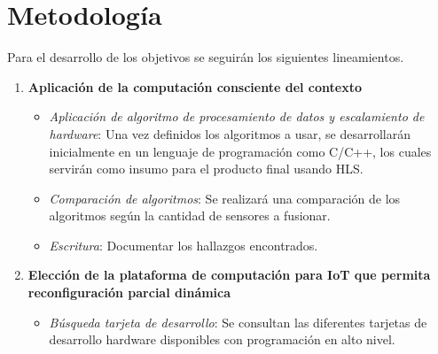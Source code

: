 
\chapter{Metodología} %
\label{Chapter8}

Para el desarrollo de  los objetivos se seguirán los siguientes lineamientos.
\begin{enumerate}
\item \textbf{Aplicación de la computación consciente del contexto}
\begin{itemize}
\item \textit{Aplicación de algoritmo de procesamiento de datos y escalamiento de hardware}: Una vez definidos los algoritmos a usar, se desarrollarán inicialmente en un lenguaje de programación como C/C++, los cuales servirán como insumo para el producto final usando HLS.
\item \textit{Comparación de algoritmos}: Se realizará una comparación de los algoritmos según la cantidad de sensores a fusionar.
\item \textit{Escritura}: Documentar los hallazgos encontrados.
\end{itemize}

\item \textbf{Elección de la plataforma de computación para IoT que permita reconfiguración parcial dinámica}
\begin{itemize}
\item \textit{Búsqueda tarjeta de desarrollo}: Se consultan las diferentes tarjetas de desarrollo hardware disponibles con programación en alto nivel.


\end{itemize}
\end{enumerate}
